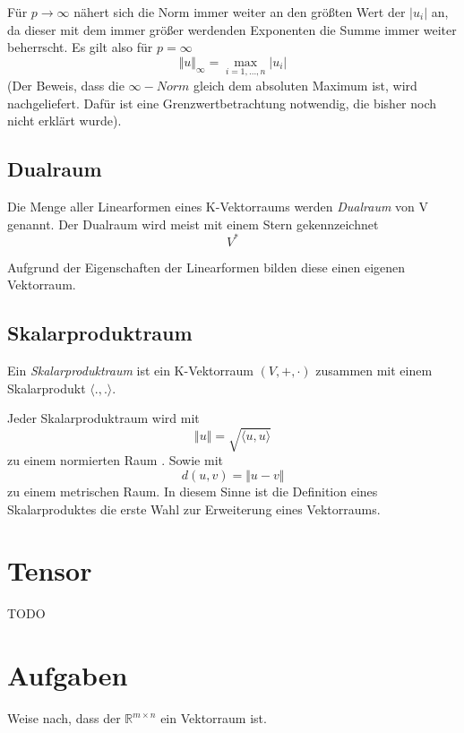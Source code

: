 Für $p \longrightarrow \infty$ nähert sich die Norm immer weiter an den größten Wert der $\vert u_i \vert$ an, da dieser mit dem immer größer werdenden Exponenten die Summe immer weiter beherrscht. Es gilt also für $p=\infty$
\[
\Vert u \Vert_\infty = \max_{i=1,\dots, n}  \vert u_i\vert
\]
(Der Beweis, dass die $\infty -Norm$ gleich dem absoluten Maximum ist, wird nachgeliefert. Dafür ist eine Grenzwertbetrachtung notwendig, die bisher noch nicht erklärt wurde).

\subsection{Dualraum}

\begin{definition}
Die Menge aller Linearformen eines K-Vektorraums werden \textsl{Dualraum} von V genannt. Der Dualraum wird meist mit einem Stern gekennzeichnet
\[V^* \]
\end{definition}

Aufgrund der Eigenschaften der Linearformen bilden diese einen eigenen Vektorraum. 

\subsection{Skalarproduktraum}

\begin{definition}
Ein \textsl{Skalarproduktraum} ist ein K-Vektorraum $(V,+,\cdot)$ zusammen mit einem Skalarprodukt $\langle .,. \rangle$.
\end{definition}

Jeder Skalarproduktraum wird mit 
\[ \Vert u \Vert = \sqrt{\langle u,u \rangle} \]
zu einem normierten Raum . Sowie mit 
\[ d(u,v) = \Vert u-v \Vert \]
zu einem metrischen Raum.  In diesem Sinne ist die Definition eines Skalarproduktes die erste Wahl zur Erweiterung eines Vektorraums. 



\section{Tensor}

TODO

\section{Aufgaben}

\begin{prob}
\label{matrix.1}

Weise nach, dass der $\mathbb{R}^{m\times n}$ ein Vektorraum ist. 

\end{prob}


